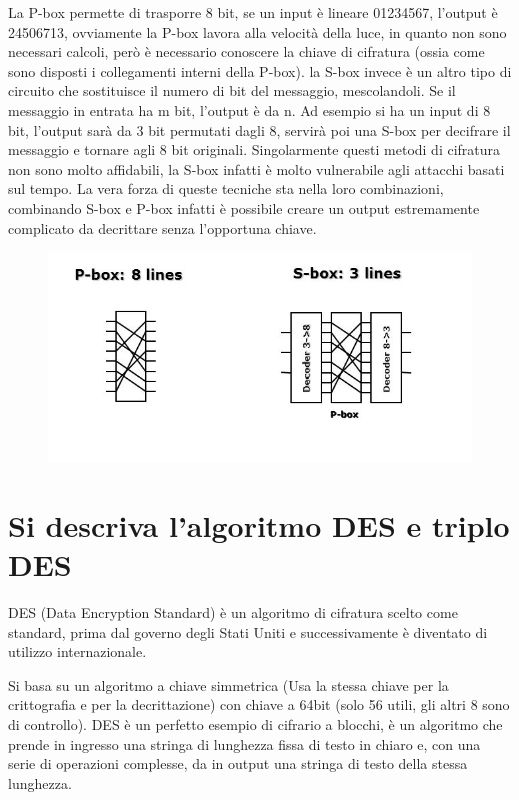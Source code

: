 La P-box permette di trasporre 8 bit, se un input è lineare 01234567, l’output è 24506713, ovviamente la P-box lavora alla velocità della luce, in quanto non sono necessari calcoli, però è necessario conoscere la chiave di cifratura (ossia come sono disposti i collegamenti interni della P-box).
la S-box invece è un altro tipo di circuito che sostituisce il numero di bit del messaggio, mescolandoli.
Se il messaggio in entrata ha m bit, l’output è da n. Ad esempio si ha un input di 8 bit, l’output sarà da 3 bit permutati dagli 8, servirà poi una S-box per decifrare il messaggio e tornare agli 8 bit originali. 
Singolarmente questi metodi di cifratura non sono molto affidabili, la S-box infatti è molto vulnerabile agli attacchi basati sul tempo.
La vera forza di queste tecniche sta nella loro combinazioni, combinando S-box e P-box infatti è possibile creare un output estremamente complicato da decrittare senza l’opportuna chiave. 
 
\begin{figure}[H]
\centering
\includegraphics[scale=0.6]{res/img/52_P-boxS-box.png}
\end{figure}

\section{Si descriva l’algoritmo DES e triplo DES}

DES (Data Encryption Standard) è un algoritmo di cifratura scelto come standard, prima dal governo degli Stati Uniti e successivamente è diventato di utilizzo internazionale.

Si basa su un algoritmo a chiave simmetrica (Usa la stessa chiave per la crittografia e per la decrittazione) con chiave a 64bit (solo 56 utili, gli altri 8 sono di controllo).
DES è un perfetto esempio di cifrario a blocchi, è un algoritmo che prende in ingresso una stringa di lunghezza fissa di testo in chiaro e, con una serie di operazioni complesse, da in output una stringa di testo della stessa lunghezza.

